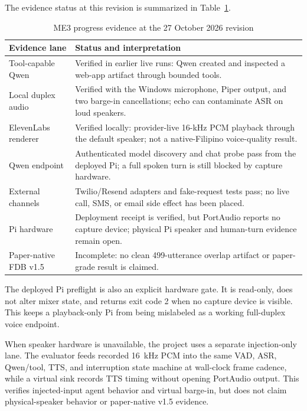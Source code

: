 \documentclass[sigconf,nonacm]{acmart}
\begin{document}
The evidence status at this revision is summarized in
Table~\ref{tab:progress}.

\begin{table}[t]
\caption{ME3 progress evidence at the 27 October 2026 revision}
\label{tab:progress}
\small
\begin{tabularx}{\columnwidth}{@{}lX@{}}
\toprule
Evidence lane & Status and interpretation \\
\midrule
Tool-capable Qwen & Verified in earlier live runs: Qwen created and inspected
a web-app artifact through bounded tools. \\
Local duplex audio & Verified with the Windows microphone, Piper output, and
two barge-in cancellations; echo can contaminate ASR on loud speakers. \\
ElevenLabs renderer & Verified locally: provider-live 16-kHz PCM playback
through the default speaker; not a native-Filipino voice-quality result. \\
Qwen endpoint & Authenticated model discovery and chat probe pass from the
deployed Pi; a full spoken turn is still blocked by capture hardware. \\
External channels & Twilio/Resend adapters and fake-request tests pass; no
live call, SMS, or email side effect has been placed. \\
Pi hardware & Deployment receipt is verified, but PortAudio reports no capture
device; physical Pi speaker and human-turn evidence remain open. \\
Paper-native FDB v1.5 & Incomplete: no clean 499-utterance overlap artifact
or paper-grade result is claimed. \\
\bottomrule
\end{tabularx}
\end{table}

The deployed Pi preflight is also an explicit hardware gate. It is read-only,
does not alter mixer state, and returns exit code 2 when no capture device is
visible. This keeps a playback-only Pi from being mislabeled as a working
full-duplex voice endpoint.

When speaker hardware is unavailable, the project uses a separate
injection-only lane. The evaluator feeds recorded 16~kHz PCM into the same
VAD, ASR, Qwen/tool, TTS, and interruption state machine at wall-clock frame
cadence, while a virtual sink records TTS timing without opening PortAudio
output. This verifies injected-input agent behavior and virtual barge-in, but
does not claim physical-speaker behavior or paper-native v1.5 evidence.
\end{document}
